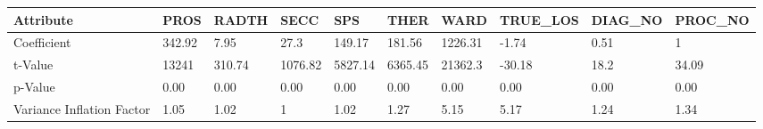 \begin{tabular}{llllllllll}
\toprule
Attribute &    PROS &   RADTH &     SECC &      SPS &     THER &     WARD & TRUE\_LOS & DIAG\_NO & PROC\_NO \\
\midrule
Coefficient               &  342.92 &    7.95 &     27.3 &   149.17 &   181.56 &  1226.31 &    -1.74 &    0.51 &       1 \\
t-Value                   &   13241 &  310.74 &  1076.82 &  5827.14 &  6365.45 &  21362.3 &   -30.18 &    18.2 &   34.09 \\
p-Value                   &    0.00 &    0.00 &     0.00 &     0.00 &     0.00 &     0.00 &     0.00 &    0.00 &    0.00 \\
Variance Inflation Factor &    1.05 &    1.02 &        1 &     1.02 &     1.27 &     5.15 &     5.17 &    1.24 &    1.34 \\
\bottomrule
\end{tabular}
